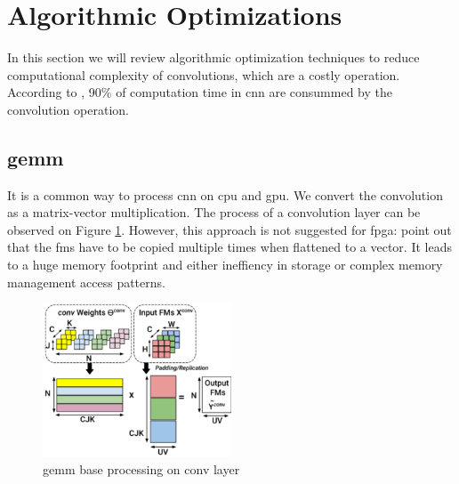 \section{Algorithmic Optimizations} \label{sec:algopti}
In this section we will review algorithmic optimization techniques to reduce computational complexity of convolutions, which are a costly operation. According to \cite{shawahna_fpga-based_2019}, 90\% of computation time in \acrshort{cnn} are consummed by the convolution operation.
%
%
\subsection{\acrfull{gemm}}
%
%
It is a common way to process \acrshort{cnn} on \acrshort{cpu} and \acrshort{gpu}. We convert the convolution as a matrix-vector multiplication.  The process of a convolution layer can be observed on Figure \ref{fig:gemm}.
However, this approach is not suggested for \acrshort{fpga}: \cite{sze_efficient_2017, zhu_efficient_2020} point out that the \acrshort{fm}s have to be copied multiple times when flattened to a vector. It leads to a huge memory footprint and either ineffiency in storage or complex memory management access patterns.
\begin{figure}
    \centering
    \includegraphics[width=0.5\textwidth]{Images/gemm.pdf}
    \caption{\acrshort{gemm} base processing on conv layer}
    \label{fig:gemm}
\end{figure}
%
%
